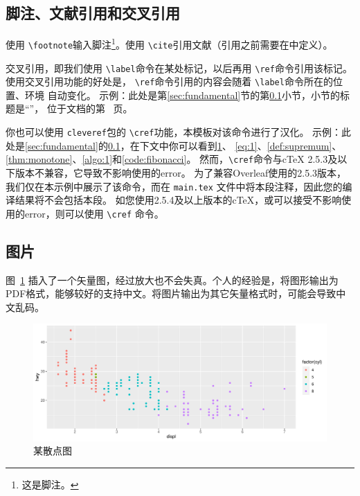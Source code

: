 \documentclass[zihao = -4, linespread = 1.5]{ctexart} %
\begin{document}
\subsection{脚注、文献引用和交叉引用}\label{subsec:crossRef}
使用 \texttt{\textbackslash footnote}输入脚注\footnote{这是脚注。 }。使用 \texttt{\textbackslash cite}引用文献\cite{PangQingShan}（引用之前需要在中定义）。

交叉引用，即我们使用 \texttt{\textbackslash label}命令在某处标记，以后再用 \texttt{\textbackslash ref}命令引用该标记。
使用交叉引用功能的好处是， \texttt{\textbackslash ref}命令引用的内容会随着 \texttt{\textbackslash label}命令所在的位置、环境
自动变化。
示例：此处是第\ref{sec:fundamental}节的第\ref{subsec:crossRef}小节，小节的标题是“”，
位于文档的第~\pageref{subsec:crossRef} 页。%

你也可以使用 \texttt{cleveref}包的 \texttt{\textbackslash cref}功能，本模板对该命令进行了汉化。
示例：此处是\cref{sec:fundamental}的\cref{subsec:crossRef}，在下文中你可以看到\cref{fig:scatter}、
\cref{eq:1}、\cref{def:supremum}、\cref{thm:monotone}、\cref{algo:1}和\cref{code:fibonacci}。
然而，\texttt{\textbackslash cref}命令与cTeX 2.5.3及以下版本不兼容，它导致不影响使用的error。
为了兼容Overleaf使用的2.5.3版本，我们仅在本示例中展示了该命令，而在 \texttt{main.tex} 文件中将本段注释，因此您的编译结果将不会包括本段。
如您使用2.5.4及以上版本的cTeX，或可以接受不影响使用的error，则可以使用 \texttt{\textbackslash cref} 命令。


\subsection{图片}
图~\ref{fig:scatter} 插入了一个矢量图，经过放大也不会失真。个人的经验是，将图形输出为PDF格式，能够较好的支持中文。将图片输出为其它矢量格式时，可能会导致中文乱码。
\begin{figure}[htpb]
  \centering
  \includegraphics[width=\textwidth]{picture/scatter.pdf}
  \caption{某散点图  \protect\footnotemark} %
  \label{fig:scatter}
\end{figure}
\end{document}
